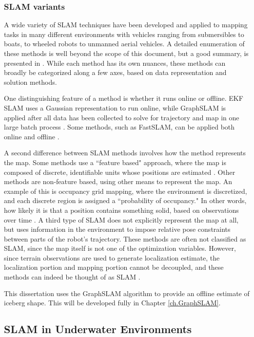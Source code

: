 \subsubsection{SLAM variants}

A wide variety of SLAM techniques have been developed and applied to mapping tasks in many different environments with vehicles ranging from submersibles to boats, to wheeled robots to unmanned aerial vehicles. A detailed enumeration of these methods is well beyond the scope of this document, but a good summary, is presented in \cite{SLAMoverview}. While each method has its own nuances, these methods can broadly be categorized along a few axes, based on data representation and solution methods. 

One distinguishing feature of a method is whether it runs online or offline. EKF SLAM uses a Gaussian representation to run online, while GraphSLAM is applied after all data has been collected to solve for trajectory and map in one large batch process \cite{Thrun2005}. Some methods, such as FastSLAM, can be applied both online and offline \cite{Montemerlo2002}.

A second difference between SLAM methods involves how the method represents the map. Some methods use a ``feature based" approach, where the map is composed of discrete, identifiable units whose positions are estimated \cite{Durrant2006}. Other methods are non-feature based, using other means to represent the map. An example of this is occupancy grid mapping, where the environment is discretized, and each discrete region is assigned a ``probability of occupancy." In other words, how likely it is that a position contains something solid, based on observations over time \cite{Fairfield2007}.  A third type of SLAM does not explicitly represent the map at all, but uses information in the environment to impose relative pose constraints between parts of the robot's trajectory. These methods are often not classified as SLAM, since the map itself is not one of the optimization variables. However, since terrain observations are used to generate localization estimate,  the localization portion and mapping portion cannot be decoupled, and these methods can indeed be thought of as SLAM \cite{Caress2008}. 

This dissertation uses the GraphSLAM algorithm \cite{Thrun2006} to provide an offline estimate of iceberg shape. This will be developed fully in Chapter \ref{ch.GraphSLAM}. 

\subsection{SLAM in Underwater Environments}

